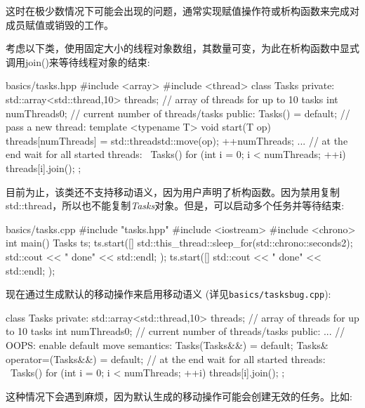 这时在极少数情况下可能会出现的问题，通常实现赋值操作符或析构函数来完成对成员赋值或销毁的工作。\par

考虑以下类，使用固定大小的线程对象数组，其数量可变，为此在析构函数中显式调用join()来等待线程对象的结束:\par

\begin{codeboxt}[cpp]{basics/tasks.hpp}
#include <array>
#include <thread>
class Tasks {
  private:
  std::array<std::thread,10> threads; // array of threads for up to 10 tasks
  int numThreads{0}; // current number of threads/tasks
  public:
  Tasks() = default;
  // pass a new thread:
  template <typename T>
  void start(T op) {
    threads[numThreads] = std::thread{std::move(op)};
    ++numThreads;
  }
  ...
  // at the end wait for all started threads:
  ~Tasks() {
    for (int i = 0; i < numThreads; ++i) {
      threads[i].join();
    }
  }
};
\end{codeboxt}

目前为止，该类还不支持移动语义，因为用户声明了析构函数。因为禁用复制std::thread，所以也不能复制\textit{Tasks}对象。但是，可以启动多个任务并等待结束:\par

\begin{codeboxt}[cpp]{basics/tasks.cpp}
#include "tasks.hpp"
#include <iostream>
#include <chrono>
int main()
{
  Tasks ts;
  ts.start([]{
    std::this_thread::sleep_for(std::chrono::seconds{2});
    std::cout << " done" << std::endl;
  });
  ts.start([]{
    std::cout << " done" << std::endl;
  });
}
\end{codeboxt}

现在通过生成默认的移动操作来启用移动语义
(详见\texttt{basics/\allowbreak{}tasksbug.cpp}):\par

\begin{codebox}[cpp]
class Tasks {
private:
  std::array<std::thread,10> threads; // array of threads for up to 10 tasks
  int numThreads{0}; // current number of threads/tasks
public:
  ...
  // OOPS: enable default move semantics:
  Tasks(Tasks&&) = default;
  Tasks& operator=(Tasks&&) = default;
  // at the end wait for all started threads:
  ~Tasks() {
    for (int i = 0; i < numThreads; ++i) {
      threads[i].join();
    }
  }
};
\end{codebox}

这种情况下会遇到麻烦，因为默认生成的移动操作可能会创建无效的任务。比如:\par

